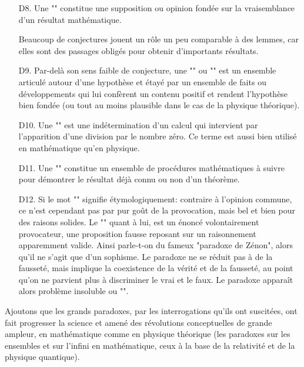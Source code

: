 \begin{itemize}
	\item[D8.] Une "" constitue une supposition ou opinion fondée sur la vraisemblance d'un résultat mathématique.
	
	Beaucoup de conjectures jouent un rôle un peu comparable à des lemmes, car elles sont des passages obligés pour obtenir d'importants résultats.
	
	\item[D9.] Par-delà son sens faible de conjecture, une "" ou "" est un ensemble articulé autour d'une hypothèse et étayé par un ensemble de faits ou développements qui lui confèrent un contenu positif et rendent l'hypothèse bien fondée (ou tout au moins plausible dans le cas de la physique théorique).

	\item[D10.]  Une "" est une indétermination d'un calcul qui intervient par l'apparition d'une division par le nombre zéro. Ce terme est aussi bien utilisé en mathématique qu'en physique.  

	\item[D11.] Une "" constitue un ensemble de procédures mathématiques à suivre pour démontrer le résultat déjà connu ou non d'un théorème.

	\item[D12.] Si le mot "" signifie étymologiquement: contraire à l'opinion commune, ce n'est cependant pas par pur goût de la provocation, mais bel et bien pour des raisons solides. Le "" quant à lui, est un énoncé volontairement provocateur, une proposition fausse reposant sur un raisonnement apparemment valide. Ainsi parle-t-on du fameux "paradoxe de Zénon", alors qu'il ne s'agit que d'un sophisme. Le paradoxe ne se réduit pas à de la fausseté, mais implique la coexistence de la vérité et de la fausseté, au point qu'on ne parvient plus à discriminer le vrai et le faux. Le paradoxe apparaît alors problème insoluble ou "". 
	
\end{itemize}

	\begin{tcolorbox}[title=Remark,colframe=black,arc=10pt]
	Ajoutons que les grands paradoxes, par les interrogations qu'ils ont suscitées, ont fait progresser la science et amené des révolutions conceptuelles de grande ampleur, en mathématique comme en physique théorique (les paradoxes sur les ensembles et sur l'infini en mathématique, ceux à la base de la relativité et de la physique quantique).
	\end{tcolorbox}	

